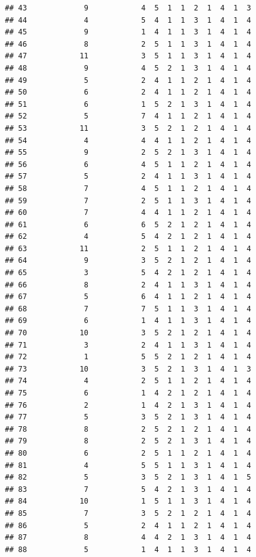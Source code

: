 \documentclass[12pt,]{krantz}
\theoremstyle{definition}
\theoremstyle{definition}
\theoremstyle{remark}
\begin{document}
\begin{verbatim}
## 43             9            4  5  1  1  2  1  4  1  3
## 44             4            5  4  1  1  3  1  4  1  4
## 45             9            1  4  1  1  3  1  4  1  4
## 46             8            2  5  1  1  3  1  4  1  4
## 47            11            3  5  1  1  3  1  4  1  4
## 48             9            4  5  2  1  3  1  4  1  4
## 49             5            2  4  1  1  2  1  4  1  4
## 50             6            2  4  1  1  2  1  4  1  4
## 51             6            1  5  2  1  3  1  4  1  4
## 52             5            7  4  1  1  2  1  4  1  4
## 53            11            3  5  2  1  2  1  4  1  4
## 54             4            4  4  1  1  2  1  4  1  4
## 55             9            2  5  2  1  3  1  4  1  4
## 56             6            4  5  1  1  2  1  4  1  4
## 57             5            2  4  1  1  3  1  4  1  4
## 58             7            4  5  1  1  2  1  4  1  4
## 59             7            2  5  1  1  3  1  4  1  4
## 60             7            4  4  1  1  2  1  4  1  4
## 61             6            6  5  2  1  2  1  4  1  4
## 62             4            5  4  2  1  2  1  4  1  4
## 63            11            2  5  1  1  2  1  4  1  4
## 64             9            3  5  2  1  2  1  4  1  4
## 65             3            5  4  2  1  2  1  4  1  4
## 66             8            2  4  1  1  3  1  4  1  4
## 67             5            6  4  1  1  2  1  4  1  4
## 68             7            7  5  1  1  3  1  4  1  4
## 69             6            1  4  1  1  3  1  4  1  4
## 70            10            3  5  2  1  2  1  4  1  4
## 71             3            2  4  1  1  3  1  4  1  4
## 72             1            5  5  2  1  2  1  4  1  4
## 73            10            3  5  2  1  3  1  4  1  3
## 74             4            2  5  1  1  2  1  4  1  4
## 75             6            1  4  2  1  2  1  4  1  4
## 76             2            1  4  2  1  3  1  4  1  4
## 77             5            3  5  2  1  3  1  4  1  4
## 78             8            2  5  2  1  2  1  4  1  4
## 79             8            2  5  2  1  3  1  4  1  4
## 80             6            2  5  1  1  2  1  4  1  4
## 81             4            5  5  1  1  3  1  4  1  4
## 82             5            3  5  2  1  3  1  4  1  5
## 83             7            5  4  2  1  3  1  4  1  4
## 84            10            1  5  1  1  3  1  4  1  4
## 85             7            3  5  2  1  2  1  4  1  4
## 86             5            2  4  1  1  2  1  4  1  4
## 87             8            4  4  2  1  3  1  4  1  4
## 88             5            1  4  1  1  3  1  4  1  4

\end{verbatim}
\end{document}
